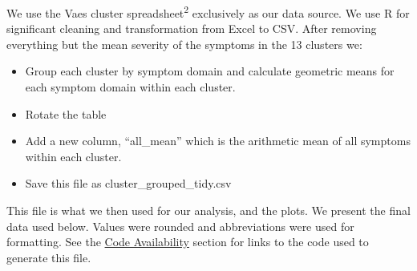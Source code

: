 \documentclass[
  letterpaper,
  DIV=11,
  numbers=noendperiod]{scrartcl}
\providecommand{\tightlist}{%
  \setlength{\itemsep}{0pt}\setlength{\parskip}{0pt}}
\begin{document}
We use the Vaes cluster spreadsheet\textsuperscript{2} exclusively as
our data source. We use R for significant cleaning and transformation
from Excel to CSV. After removing everything but the mean severity of
the symptoms in the 13 clusters we:

\begin{itemize}
\tightlist
\item
  Group each cluster by symptom domain and calculate geometric means for
  each symptom domain within each cluster.
\item
  Rotate the table
\item
  Add a new column, ``all\_mean'' which is the arithmetic mean of all
  symptoms within each cluster.
\item
  Save this file as cluster\_grouped\_tidy.csv
\end{itemize}

This file is what we then used for our analysis, and the plots. We
present the final data used below. Values were rounded and abbreviations
were used for formatting. See the \hyperref[sec-code]{Code Availability}
section for links to the code used to generate this file.
\end{document}
